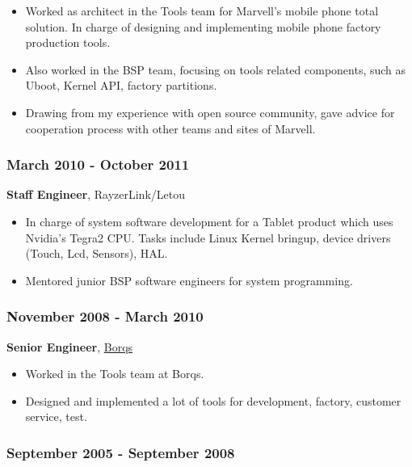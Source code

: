 \documentclass[11pt]{article}
\begin{document}
\begin{CJK*}{UTF8}{simsun}
\begin{itemize}
\item Worked as architect in the Tools team for Marvell's mobile phone
total solution. In charge of designing and implementing mobile
phone factory production tools.

\item Also worked in the BSP team, focusing on tools related
components, such as Uboot, Kernel API, factory partitions.
\end{itemize}


\begin{itemize}
\item Drawing from my experience with open source community, gave
advice for cooperation process with other teams and sites of
Marvell.
\end{itemize}


\subsubsection{March 2010 - October 2011}
\label{sec-1-0-4}

\textbf{Staff Engineer}, RayzerLink/Letou

\begin{itemize}
\item In charge of system software development for a Tablet product
which uses Nvidia's Tegra2 CPU. Tasks include Linux Kernel
bringup, device drivers (Touch, Lcd, Sensors), HAL.

\item Mentored junior BSP software engineers for system programming.
\end{itemize}

\subsubsection{November 2008 - March 2010}
\label{sec-1-0-5}

\textbf{Senior Engineer}, \href{http://www.borqs.com}{Borqs}

\begin{itemize}
\item Worked in the Tools team at Borqs.

\item Designed and implemented a lot of tools for development,
factory, customer service, test.
\end{itemize}

\subsubsection{September 2005 - September 2008}
\label{sec-1-0-6}


\end{CJK*}
\end{document}

